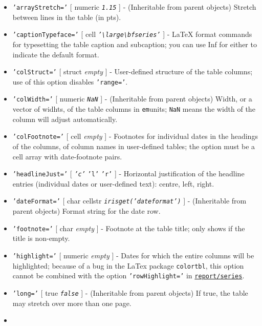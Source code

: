\begin{itemize}
\item
  \texttt{'arrayStretch='} {[} numeric \textbar{} \emph{\texttt{1.15}}
  {]} - (Inheritable from parent objects) Stretch between lines in the
  table (in pts).
\item
  \texttt{'captionTypeface='} {[} cell \textbar{}
  \emph{\texttt{'\textbackslash{}large\textbackslash{}bfseries'}} {]} -
  LaTeX format commands for typesetting the table caption and
  subcaption; you can use Inf for either to indicate the default format.
\item
  \texttt{'colStruct='} {[} struct \textbar{} \emph{empty} {]} -
  User-defined structure of the table columns; use of this option
  disables \texttt{'range='}.
\item
  \texttt{'colWidth='} {[} numeric \textbar{} \emph{\texttt{NaN}} {]} -
  (Inheritable from parent objects) Width, or a vector of widhts, of the
  table columns in \texttt{em}units; \texttt{NaN} means the width of the
  column will adjust automatically.
\item
  \texttt{'colFootnote='} {[} cell \textbar{} \emph{empty} {]} -
  Footnotes for individual dates in the headings of the columns, of
  column names in user-defined tables; the option must be a cell array
  with date-footnote pairs.
\item
  \texttt{'headlineJust='} {[} \emph{\texttt{'c'}} \textbar{}
  \texttt{'l'} \textbar{} \texttt{'r'} {]} - Horizontal justification of
  the headline entries (individual dates or user-defined text): centre,
  left, right.
\item
  \texttt{'dateFormat='} {[} char \textbar{} cellstr \textbar{}
  \emph{\texttt{irisget('dateformat')}} {]} - (Inheritable from parent
  objects) Format string for the date row.
\item
  \texttt{'footnote='} {[} char \textbar{} \emph{empty} {]} - Footnote
  at the table title; only shows if the title is non-empty.
\item
  \texttt{'highlight='} {[} numeric \textbar{} \emph{empty} {]} - Dates
  for which the entire columns will be highlighted; because of a bug in
  the LaTex package \texttt{colortbl}, this option cannot be combined
  with the option \texttt{'rowHighlight='} in
  \href{report/series}{\texttt{report/series}}.
\item
  \texttt{'long='} {[} true \textbar{} \emph{\texttt{false}} {]} -
  (Inheritable from parent objects) If true, the table may stretch over
  more than one page.
\item

\end{itemize}
